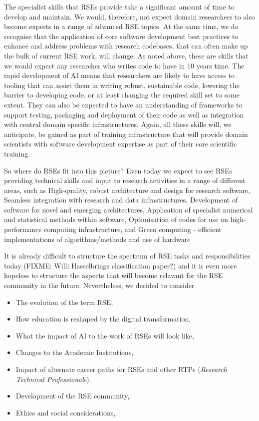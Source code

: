 \documentclass{eceasst}
\begin{document}
The specialist skills that RSEs provide take a significant amount of time to develop and maintain.
We would, therefore, not expect domain researchers to also become experts in a range of
advanced RSE topics. 
At the same time, we do recognise that the application of core software development best practices
to enhance and address problems with research codebases, that can often make up the bulk of
current RSE work, will change. As noted above, these are skills that we
would expect any researcher who writes code to have in 10 years time. 
The rapid development of AI means that researchers are likely to have access to tooling that can assist
them in writing robust, sustainable code, lowering the barrier to developing code, or at least changing the
required skill set to some extent.
They can also be expected to have an understanding of frameworks to support testing, packaging and
deployment of their code as well as integration with central domain specific infrastructures.
Again, all these skills will, we anticipate, be gained as part of training infrastructure that will
provide domain scientists with software development expertise as part of their core scientific training.

So where do RSEs fit into this picture? Even today we expect to see RSEs providing technical skills and input
to research activities in a range of different areas, such as
High-quality, robust architecture and design for research software,
Seamless integration with research and data infrastructures,
Development of software for novel and emerging architectures,
Application of specialist numerical and statistical methods within software,
Optimisation of codes for use on high-performance computing infrastructure,
and Green computing - efficient implementations of algorithms/methods and use of hardware

It is already difficult to structure the spectrum of RSE tasks and responsibilities today (FIXME: Willi Hasselbrings classification paper?)
and it is even more hopeless to structure the aspects that will become relavant for the RSE community in the future.
Nevertheless, we decided to consider
\begin{itemize}
\item The evolution of the term RSE,
\item How education is reshaped by the digital transformation,
\item What the impact of AI to the work of RSEs will look like,
\item Changes to the Academic Institutions,
\item Impact of alternate career paths for RSEs and other RTPs (\emph{Research Technical Professional}s).
\item Development of the RSE community,
\item Ethics and social considerations,
\end{itemize}
\end{document}
